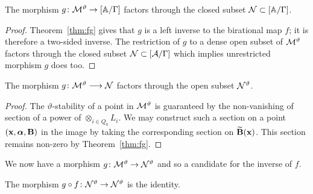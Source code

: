 \documentclass{amsart}
\newcommand{\balpha}{\boldsymbol{\alpha}}
\theoremstyle{definition}
\begin{document}
\begin{corollary}
The morphism $g \colon \mathcal{M}^\vartheta \rightarrow [\mathbb{A}/\Gamma]$ factors through the closed subset $\mathcal{N} \subset [\mathbb{A}/\Gamma]$.
\end{corollary}

\begin{proof}
Theorem~\ref{thm:fg} gives that $g$ is a left inverse to the birational map $f$; it is therefore a two-sided inverse.
The restriction of $g$ to a dense open subset of $\mathcal{M}^\vartheta$ factors through the closed subset $\mathcal{N} \subset [\mathcal{A}/\Gamma]$ which implies unrestricted morphism $g$ does too.
\end{proof}

\begin{corollary}
The morphism $g \colon \mathcal{M}^\vartheta \longrightarrow \mathcal{N}$ factors through the open subset $\mathcal{N}^\vartheta$.
\end{corollary}

\begin{proof}
The $\vartheta$-stability of a point in $\mathcal{M}^\vartheta$ is guaranteed by the non-vanishing of section of a power of $\otimes_{i \in Q_0} L_i$.
We may construct such a section on a point $(\bfx, \balpha, \bfB)$ in the image by taking the corresponding section on $\widetilde{\mathbf{B}}(\mathbf{x})$.
This section remains non-zero by Theorem~\ref{thm:fg}.
\end{proof}

We now have a morphism $g \colon \mathcal{M}^\vartheta \rightarrow \mathcal{N}^\vartheta$ and so a candidate for the inverse of $f$.

\begin{theorem}\label{thm:ghilb}
The morphism $g \circ f \colon \mathcal{N}^\vartheta \rightarrow \mathcal{N}^\vartheta$ is the identity.
\end{theorem}
\end{document}
